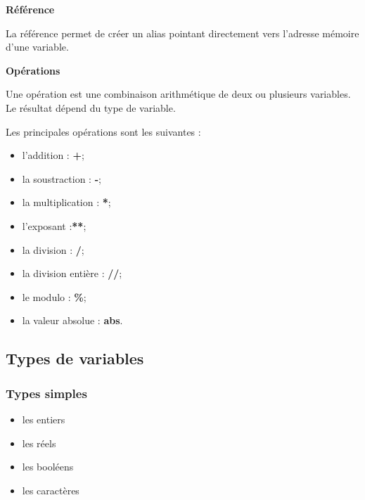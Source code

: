 \documentclass[11pt,oneside]{article}
\begin{document}
\begin{defi}
\textbf{Référence}

La référence permet de créer un alias pointant directement vers l'adresse mémoire d'une variable.
\end{defi}

\begin{defi}
\textbf{Opérations}

Une opération est une combinaison arithmétique de deux ou plusieurs variables. Le résultat dépend du type de variable. 

Les principales opérations sont les suivantes : 
\begin{itemize}
\item l'addition : \textbf{+};
\item la soustraction : \textbf{-};
\item la multiplication : \textbf{*};
\item l'exposant :\textbf{**};
\item la division : \textbf{/};
\item la division entière : \textbf{//};
\item le modulo : \textbf{\%};
\item la valeur absolue : \textbf{abs}.
\end{itemize}
\end{defi}




\subsection{Types de variables}

\subsubsection{Types simples}
\begin{defi}
\begin{itemize}
\item les entiers
\item les réels
\item les booléens
\item les caractères
\end{itemize}
\end{defi}
\end{document}
